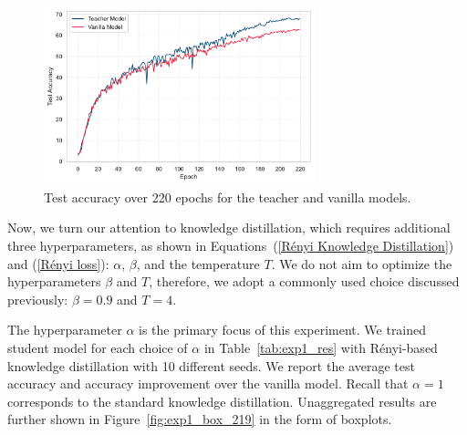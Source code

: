\begin{figure}[h!]
	\centering
	\includegraphics[width=0.7\textwidth]{../img/teacher_vanilla_model.pdf}
	\caption{Test accuracy over 220 epochs for the teacher and vanilla models.}
	\label{fig:teacher_vanilla_model}
\end{figure}

Now, we turn our attention to knowledge distillation, which requires additional three hyperparameters, as shown in Equations~(\ref{Rényi Knowledge Distillation}) and (\ref{Rényi loss}): $\alpha$, $\beta$, and the temperature $T$. We do not aim to optimize the hyperparameters $\beta$ and $T$, therefore, we adopt a commonly used choice discussed previously: $\beta = 0.9$ and $T = 4$.

The hyperparameter $\alpha$ is the primary focus of this experiment. We trained student model for each choice of $\alpha$ in Table~\ref{tab:exp1_res} with Rényi-based knowledge distillation with 10 different seeds. We report the average test accuracy and accuracy improvement over the vanilla model. Recall that $\alpha=1$ corresponds to the standard knowledge distillation. Unaggregated results are further shown in Figure~\ref{fig:exp1_box_219} in the form of boxplots.

